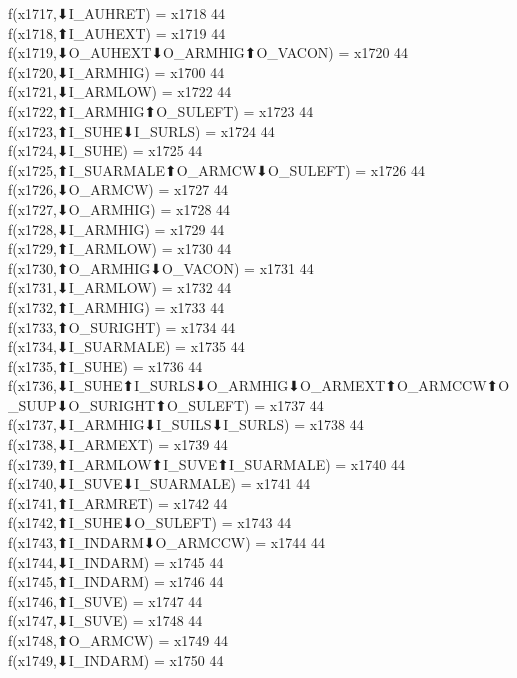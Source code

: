 f(x1717,⬇I_AUHRET) = x1718 {44} \\
f(x1718,⬆I_AUHEXT) = x1719 {44} \\
f(x1719,⬇O_AUHEXT⬇O_ARMHIG⬆O_VACON) = x1720 {44} \\
f(x1720,⬇I_ARMHIG) = x1700 {44} \\
f(x1721,⬇I_ARMLOW) = x1722 {44} \\
f(x1722,⬆I_ARMHIG⬆O_SULEFT) = x1723 {44} \\
f(x1723,⬆I_SUHE⬇I_SURLS) = x1724 {44} \\
f(x1724,⬇I_SUHE) = x1725 {44} \\
f(x1725,⬆I_SUARMALE⬆O_ARMCW⬇O_SULEFT) = x1726 {44} \\
f(x1726,⬇O_ARMCW) = x1727 {44} \\
f(x1727,⬇O_ARMHIG) = x1728 {44} \\
f(x1728,⬇I_ARMHIG) = x1729 {44} \\
f(x1729,⬆I_ARMLOW) = x1730 {44} \\
f(x1730,⬆O_ARMHIG⬇O_VACON) = x1731 {44} \\
f(x1731,⬇I_ARMLOW) = x1732 {44} \\
f(x1732,⬆I_ARMHIG) = x1733 {44} \\
f(x1733,⬆O_SURIGHT) = x1734 {44} \\
f(x1734,⬇I_SUARMALE) = x1735 {44} \\
f(x1735,⬆I_SUHE) = x1736 {44} \\
f(x1736,⬇I_SUHE⬆I_SURLS⬇O_ARMHIG⬇O_ARMEXT⬆O_ARMCCW⬆O_SUUP⬇O_SURIGHT⬆O_SULEFT) = x1737 {44} \\
f(x1737,⬇I_ARMHIG⬇I_SUILS⬇I_SURLS) = x1738 {44} \\
f(x1738,⬇I_ARMEXT) = x1739 {44} \\
f(x1739,⬆I_ARMLOW⬆I_SUVE⬆I_SUARMALE) = x1740 {44} \\
f(x1740,⬇I_SUVE⬇I_SUARMALE) = x1741 {44} \\
f(x1741,⬆I_ARMRET) = x1742 {44} \\
f(x1742,⬆I_SUHE⬇O_SULEFT) = x1743 {44} \\
f(x1743,⬆I_INDARM⬇O_ARMCCW) = x1744 {44} \\
f(x1744,⬇I_INDARM) = x1745 {44} \\
f(x1745,⬆I_INDARM) = x1746 {44} \\
f(x1746,⬆I_SUVE) = x1747 {44} \\
f(x1747,⬇I_SUVE) = x1748 {44} \\
f(x1748,⬆O_ARMCW) = x1749 {44} \\
f(x1749,⬇I_INDARM) = x1750 {44} \\
